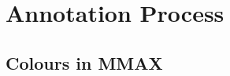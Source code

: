\documentclass[a4paper]{article}
\begin{document}
% 
% 
% 



\section{Annotation Process}

\subsection{Colours in MMAX}
\end{document}
